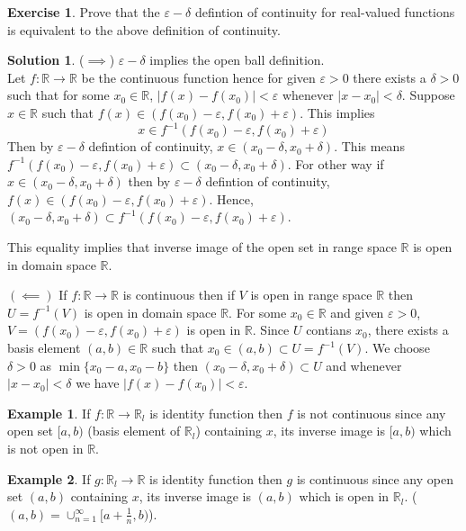 \documentclass[12pt,reqno]{amsart}
\theoremstyle{plain}
\theoremstyle{definition}
\newtheorem{exer}{Exercise}
\newtheorem{eg}{Example}
\newtheorem*{sol*}{Solution}
\newcommand{\bb}[1]{\mathbb{#1}}
\begin{document}
\begin{exer}
    Prove that the $\varepsilon-\delta$ defintion of continuity for real-valued functions is equivalent to the above definition of continuity.
\end{exer}
\begin{sol*}
    ($\implies$) $\varepsilon-\delta$ implies the open ball definition.\\
    Let $f: \bb R \to \bb R$ be the continuous function hence for given $\varepsilon > 0$ there exists a $\delta > 0$ such that for some $x_0 \in \bb R$, $|f(x) - f(x_0)| < \varepsilon$ whenever $|x-x_0| < \delta$. Suppose $x \in \bb R$ such that $f(x) \in (f(x_0) - \varepsilon, f(x_0) + \varepsilon)$. This implies 
    $$ x \in f^{-1}(f(x_0) - \varepsilon, f(x_0) + \varepsilon) $$
    Then by $\varepsilon-\delta$ defintion of continuity, $x \in (x_0-\delta, x_0+\delta)$. This means $f^{-1}(f(x_0) - \varepsilon, f(x_0) + \varepsilon) \subset (x_0-\delta, x_0+\delta)$. For other way if $x \in (x_0-\delta, x_0+\delta)$ then by $\varepsilon-\delta$ defintion of continuity, $f(x) \in (f(x_0) - \varepsilon, f(x_0) + \varepsilon)$. Hence, $(x_0-\delta, x_0+\delta) \subset f^{-1}(f(x_0) - \varepsilon, f(x_0) + \varepsilon)$. 

    This equality implies that inverse image of the open set in range space $\bb R$ is open in domain space $\bb R$.

    $(\impliedby)$ If $f: \bb R \to \bb R$ is continuous then if $V$ is open in range space $\bb R$ then $U = f^{-1}(V)$ is open in domain space $\bb R$. For some $x_0 \in \bb R$ and given $\varepsilon > 0$, $V = (f(x_0)-\varepsilon, f(x_0)+\varepsilon)$ is open in $\bb R$. Since $U$ contians $x_0$, there exists a basis element $(a,b) \in \bb R$ such that $x_0 \in (a,b) \subset U = f^{-1}(V)$. We choose $\delta > 0$ as $\min\{x_0-a, x_0-b\}$ then $(x_0 - \delta, x_0+\delta) \subset U$ and whenever $|x-x_0| < \delta$ we have $|f(x) - f(x_0)| < \varepsilon$.
\end{sol*}
\begin{eg}
    If $f: \bb R \to \bb R_l$ is identity function then $f$ is not continuous since any open set $[a,b)$ (basis element of $\bb R_l$) containing $x$, its inverse image is $[a,b)$ which is not open in $\bb R$.
\end{eg}
\begin{eg}
    If $g: \bb R_l \to \bb R$ is identity function then $g$ is continuous since any open set $(a,b)$ containing $x$, its inverse image is $(a,b)$ which is open in $\bb R_l$. ($(a,b) = \cup_{n=1}^\infty[a+\frac{1}{n},b)$).
\end{eg}
\end{document}
